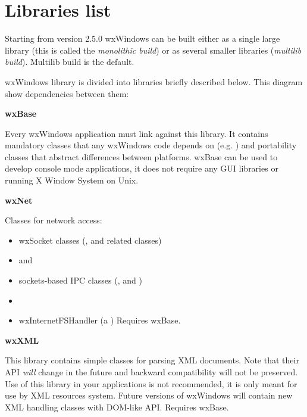 \chapter{Libraries list}\label{librarieslist}
%
\setfooter{\thepage}{}{}{}{}{\thepage}%

Starting from version 2.5.0 wxWindows can be built either as a single large
library (this is called the {\it monolithic build}) or as several smaller
libraries ({\it multilib build}). Multilib build is the default.

wxWindows library is divided into libraries briefly described below. This
diagram show dependencies between them:

\begin{center}
\end{center}

{\large {\bf wxBase}}

Every wxWindows application must link against this library. It contains
mandatory classes that any wxWindows code depends on (e.g.
) and portability classes that abstract
differences between platforms. wxBase can be used to develop console mode
applications, it does not require any GUI libraries or running X Window System
on Unix.

{\large {\bf wxNet}}

Classes for network access:

\begin{itemize}
\item{ wxSocket classes (,
  and related classes) }
\item{  and
  }
\item{ sockets-based IPC classes (,
  and
 ) }
\item{  }
\item{ wxInternetFSHandler (a ) }
Requires wxBase.
\end{itemize}

{\large {\bf wxXML}}

This library contains simple classes for parsing XML documents. Note that
their API {\em will} change in the future and backward
compatibility will not be preserved. Use of this library in your applications
is not recommended, it is only meant for use by XML resources system. Future
versions of wxWindows will contain new XML handling classes with DOM-like API.
Requires wxBase.

